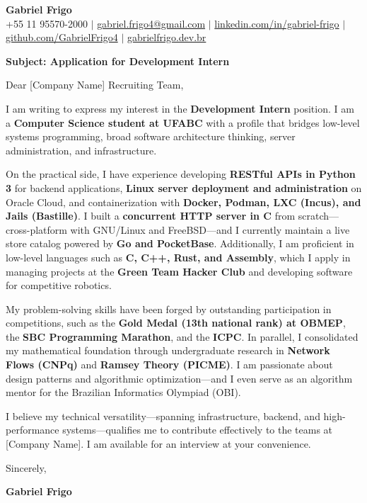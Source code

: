 \documentclass[letterpaper,10pt]{article}
\newcommand{\targetRole}{Development Intern}
\newcommand{\targetCompany}{[Company Name]}
\begin{document}
\begin{center}
  \textbf{\Huge Gabriel Frigo} \\ \vspace{5pt}
  \small +55 11 95570-2000 $|$ \href{mailto:gabriel.frigo4@gmail.com}{gabriel.frigo4@gmail.com} $|$
  \href{https://linkedin.com/in/gabriel-frigo-b6727b275/}{linkedin.com/in/gabriel-frigo} $|$
  \href{https://github.com/GabrielFrigo4}{github.com/GabrielFrigo4} $|$
  \href{https://gabrielfrigo.dev.br}{gabrielfrigo.dev.br}
\end{center}

\vspace{10pt}

\textbf{Subject: Application for \targetRole}

Dear \targetCompany{} Recruiting Team,

I am writing to express my interest in the \textbf{\targetRole} position. I am a \textbf{Computer Science student at UFABC} with a profile that bridges low-level systems programming, broad software architecture thinking, server administration, and infrastructure.

On the practical side, I have experience developing \textbf{RESTful APIs in Python 3} for backend applications, \textbf{Linux server deployment and administration} on Oracle Cloud, and containerization with \textbf{Docker, Podman, LXC (Incus), and Jails (Bastille)}. I built a \textbf{concurrent HTTP server in C} from scratch---cross-platform with GNU/Linux and FreeBSD---and I currently maintain a live store catalog powered by \textbf{Go and PocketBase}. Additionally, I am proficient in low-level languages such as \textbf{C, C++, Rust, and Assembly}, which I apply in managing projects at the \textbf{Green Team Hacker Club} and developing software for competitive robotics.

My problem-solving skills have been forged by outstanding participation in competitions, such as the \textbf{Gold Medal (13th national rank) at OBMEP}, the \textbf{SBC Programming Marathon}, and the \textbf{ICPC}. In parallel, I consolidated my mathematical foundation through undergraduate research in \textbf{Network Flows (CNPq)} and \textbf{Ramsey Theory (PICME)}. I am passionate about design patterns and algorithmic optimization---and I even serve as an algorithm mentor for the Brazilian Informatics Olympiad (OBI).

I believe my technical versatility---spanning infrastructure, backend, and high-performance systems---qualifies me to contribute effectively to the teams at \targetCompany. I am available for an interview at your convenience.

Sincerely,

\textbf{Gabriel Frigo}
\end{document}

